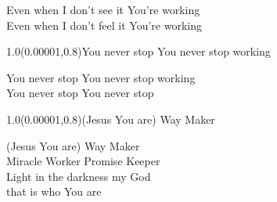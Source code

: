 \documentclass[aspectratio=169]{beamer}
\begin{document}
\begin{frame}
\centering
\color{white}
\huge{Even when I don't see it You're working} \\
\huge{Even when I don't feel it You're working} \\

\begin{textblock}{1.0}(0.00001,0.8)\color{gray}\normalsize{You never stop You never stop working}\end{textblock}
\end{frame}

\begin{frame}
\centering
\color{white}
\huge{You never stop You never stop working} \\
\huge{You never stop You never stop} \\

\begin{textblock}{1.0}(0.00001,0.8)\color{gray}\normalsize{(Jesus You are) Way Maker}\end{textblock}
\end{frame}

\begin{frame}
\centering
\color{white}
\huge{(Jesus You are) Way Maker} \\
\huge{Miracle Worker Promise Keeper} \\
\huge{Light in the darkness my God} \\
\huge{that is who You are} \\
\end{frame}
\end{document}
